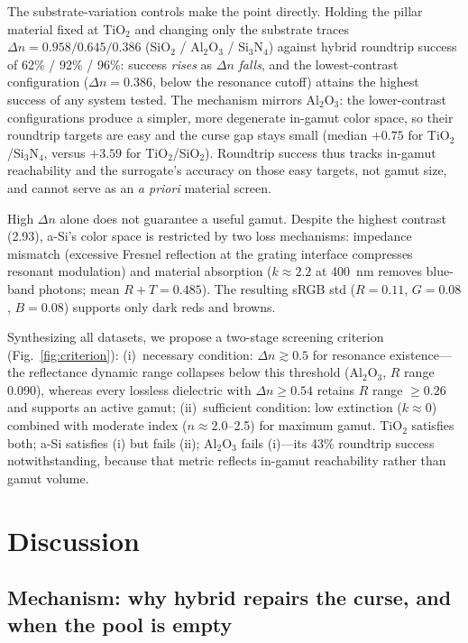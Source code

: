 \documentclass[10pt,twocolumn]{article}
\begin{document}
The substrate-variation controls make the point directly. Holding the pillar material fixed at TiO$_2$ and changing only the substrate traces $\Delta n = 0.958 / 0.645 / 0.386$ (SiO$_2$ / Al$_2$O$_3$ / Si$_3$N$_4$) against hybrid roundtrip success of 62\% / 92\% / 96\%: success \textit{rises} as $\Delta n$ \textit{falls}, and the lowest-contrast configuration ($\Delta n = 0.386$, below the resonance cutoff) attains the highest success of any system tested. The mechanism mirrors Al$_2$O$_3$: the lower-contrast configurations produce a simpler, more degenerate in-gamut color space, so their roundtrip targets are easy and the curse gap stays small (median $+0.75$ for TiO$_2$/Si$_3$N$_4$, versus $+3.59$ for TiO$_2$/SiO$_2$). Roundtrip success thus tracks in-gamut reachability and the surrogate's accuracy on those easy targets, not gamut size, and cannot serve as an \textit{a priori} material screen.

High $\Delta n$ alone does not guarantee a useful gamut. Despite the highest contrast (2.93), a-Si's color space is restricted by two loss mechanisms: impedance mismatch (excessive Fresnel reflection at the grating interface compresses resonant modulation) and material absorption ($k \approx 2.2$ at 400~nm removes blue-band photons; mean $R+T = 0.485$). The resulting sRGB std ($R = 0.11$, $G = 0.08$, $B = 0.08$) supports only dark reds and browns.

Synthesizing all datasets, we propose a two-stage screening criterion (Fig.~\ref{fig:criterion}): (i)~necessary condition: $\Delta n \gtrsim 0.5$ for resonance existence---the reflectance dynamic range collapses below this threshold (Al$_2$O$_3$, $R$ range 0.090), whereas every lossless dielectric with $\Delta n \ge 0.54$ retains $R$ range $\ge 0.26$ and supports an active gamut; (ii)~sufficient condition: low extinction ($k \approx 0$) combined with moderate index ($n \approx 2.0$--2.5) for maximum gamut. TiO$_2$ satisfies both; a-Si satisfies (i) but fails (ii); Al$_2$O$_3$ fails (i)---its 43\% roundtrip success notwithstanding, because that metric reflects in-gamut reachability rather than gamut volume.

\section{Discussion}

\subsection{Mechanism: why hybrid repairs the curse, and when the pool is empty}
\end{document}

